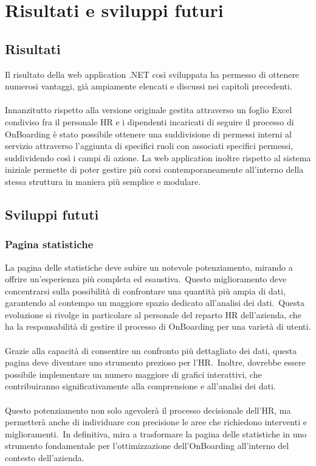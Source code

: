 \chapter{Risultati e sviluppi futuri}\label{chapter:Risultati_e_sviluppi_futuri}
%
%
\section{Risultati}\label{sec:cap_sec_subsec}
%
Il risultato della web application .NET così sviluppata ha permesso di ottenere numerosi vantaggi, già ampiamente elencati e discussi
nei capitoli precedenti.
\\ \\
Innanzitutto rispetto alla versione originale gestita attraverso un foglio Excel condiviso fra il personale HR e i dipendenti incaricati
di seguire il processo di OnBoarding è stato possibile ottenere una suddivisione di permessi interni al servizio attraverso l'aggiunta di specifici
ruoli con associati specifici permessi, suddividendo così i campi di azione.
La web application inoltre rispetto al sistema iniziale permette di poter gestire più corsi contemporaneamente all'interno della stessa struttura
in maniera più semplice e modulare.
%
\section{Sviluppi fututi}\label{sec:cap_sec_subsec}
\subsection{Pagina statistiche}\label{sec:cap_sec_subsec}
La pagina delle statistiche deve subire un notevole potenziamento, mirando a offrire un'esperienza più completa ed esaustiva.\ 
Questo miglioramento deve concentrarsi sulla possibilità di confrontare una quantità più ampia di dati, 
garantendo al contempo un maggiore spazio dedicato all'analisi dei dati.\ 
Questa evoluzione si rivolge in particolare al personale del reparto HR dell'azienda, 
che ha la responsabilità di gestire il processo di OnBoarding per una varietà di utenti.
\\ \\
Grazie alla capacità di consentire un confronto più dettagliato dei dati, questa pagina deve diventare uno strumento prezioso per l'HR.\ 
Inoltre, dovrebbe essere possibile implementare un numero maggiore di grafici interattivi, che contribuiranno significativamente 
alla comprensione e all'analisi dei dati.
\\ \\
Questo potenziamento non solo agevolerà il processo decisionale dell'HR, ma permetterà anche di individuare con precisione le aree 
che richiedono interventi e miglioramenti.\ In definitiva, mira a trasformare la pagina delle statistiche in uno strumento 
fondamentale per l'ottimizzazione dell'OnBoarding all'interno del contesto dell'azienda.
%
